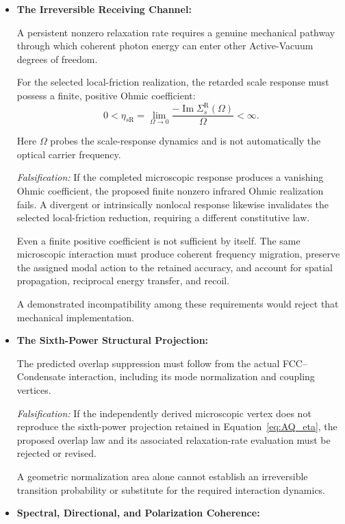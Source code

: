 \begin{itemize}

\item \textbf{The Irreversible Receiving Channel:}

A persistent nonzero relaxation rate requires a genuine
mechanical pathway through which coherent photon energy
can enter other Active-Vacuum degrees of freedom.

For the selected local-friction realization, the
retarded scale response must possess a finite, positive
Ohmic coefficient:
\begin{equation}
0<
\eta_{s\mathrm R}
=
\lim_{\Omega\to0}
\frac{-\operatorname{Im}\Sigma_s^{\mathrm R}(\Omega)}
{\Omega}
<\infty.
\end{equation}

Here $\Omega$ probes the scale-response dynamics and
is not automatically the optical carrier frequency.

\textit{Falsification:} If the completed microscopic
response produces a vanishing Ohmic coefficient, the
proposed finite nonzero infrared Ohmic realization
fails. A divergent or intrinsically nonlocal response
likewise invalidates the selected local-friction
reduction, requiring a different constitutive law.

Even a finite positive coefficient is not sufficient
by itself. The same microscopic interaction must
produce coherent frequency migration, preserve the
assigned modal action to the retained accuracy,
and account for spatial propagation, reciprocal
energy transfer, and recoil.

A demonstrated incompatibility among these requirements
would reject that mechanical implementation.

\item \textbf{The Sixth-Power Structural Projection:}

The predicted overlap suppression must follow from
the actual FCC--Condensate interaction, including
its mode normalization and coupling vertices.

\textit{Falsification:} If the independently derived
microscopic vertex does not reproduce the sixth-power
projection retained in
Equation~\eqref{eq:AQ_eta}, the proposed overlap law
and its associated relaxation-rate evaluation must
be rejected or revised.

A geometric normalization area alone cannot establish
an irreversible transition probability or substitute
for the required interaction dynamics.

\item \textbf{Spectral, Directional, and Polarization Coherence:}


\end{itemize}
